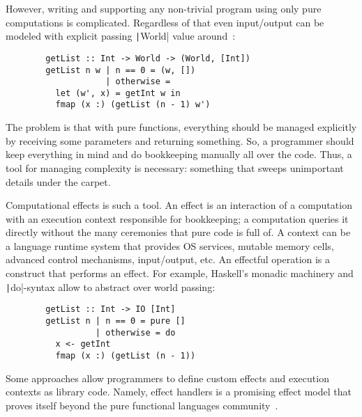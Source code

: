 \documentclass[conference]{IEEEtran}
\begin{document}
    However, writing and supporting any non-trivial program using only pure computations is complicated.
    Regardless of that even input/output can be modeled with explicit passing \texttt|World| value around~\cite{peyton1993imperative}:

    \begin{verbatim}
        getList :: Int -> World -> (World, [Int])
        getList n w | n == 0 = (w, [])
                    | otherwise =
          let (w', x) = getInt w in
          fmap (x :) (getList (n - 1) w')
    \end{verbatim}

    The problem is that with pure functions, everything should be managed explicitly by receiving some parameters and returning something.
    So, a programmer should keep everything in mind and do bookkeeping manually all over the code.
    Thus, a tool for managing complexity is necessary: something that sweeps unimportant details under the carpet.

    Computational effects is such a tool.
    An effect is an interaction of a computation with an execution context responsible for bookkeeping; a computation queries it directly without the many ceremonies that pure code is full of.
    A context can be a language runtime system that provides OS services, mutable memory cells, advanced control mechanisms, input/output, etc.
    An effectful operation is a construct that performs an effect.
    For example, Haskell's monadic machinery and \texttt|do|-syntax allow to abstract over world passing:

    \begin{verbatim}
        getList :: Int -> IO [Int]
        getList n | n == 0 = pure []
                  | otherwise = do
          x <- getInt
          fmap (x :) (getList (n - 1))
    \end{verbatim}

    Some approaches allow programmers to define custom effects and execution contexts as library code.
    Namely, effect handlers is a promising effect model that proves itself beyond the pure functional languages community~\cite{plotkin2013handling, chandrasekaran2018algebraic}.

%
\end{document}

